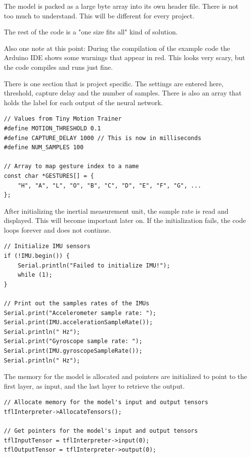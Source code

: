 \documentclass[a4paper,titlepage]{article}
\begin{document}
The model is packed as a large byte array into its own header file.
There is not too much to understand.
This will be different for every project.

The rest of the code is a "one size fits all" kind of solution.

Also one note at this point: During the compilation of the example code the Arduino IDE shows some warnings that appear in red.
This looks very scary, but the code compiles and runs just fine.

There is one section that is project specific.
The settings are entered here, threshold, capture delay and the number of samples.
There is also an array that holds the label for each output of the neural network.

\begin{lstlisting}
// Values from Tiny Motion Trainer
#define MOTION_THRESHOLD 0.1
#define CAPTURE_DELAY 1000 // This is now in milliseconds
#define NUM_SAMPLES 100

// Array to map gesture index to a name
const char *GESTURES[] = {
    "H", "A", "L", "O", "B", "C", "D", "E", "F", "G", ...
};
\end{lstlisting}

After initializing the inertial measurement unit, the sample rate is read and displayed.
This will become important later on.
If the initialization fails, the code loops forever and does not continue.

\begin{lstlisting}
// Initialize IMU sensors
if (!IMU.begin()) {
    Serial.println("Failed to initialize IMU!");
    while (1);
}

// Print out the samples rates of the IMUs
Serial.print("Accelerometer sample rate: ");
Serial.print(IMU.accelerationSampleRate());
Serial.println(" Hz");
Serial.print("Gyroscope sample rate: ");
Serial.print(IMU.gyroscopeSampleRate());
Serial.println(" Hz");
\end{lstlisting}

The memory for the model is allocated and pointers are initialized to point to the first layer, as input, and the last layer to retrieve the output.

\begin{lstlisting}
// Allocate memory for the model's input and output tensors
tflInterpreter->AllocateTensors();

// Get pointers for the model's input and output tensors
tflInputTensor = tflInterpreter->input(0);
tflOutputTensor = tflInterpreter->output(0);
\end{lstlisting}
\end{document}
